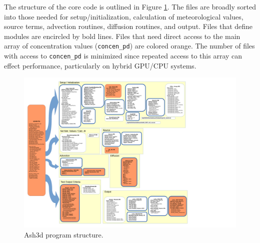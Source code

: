 The structure of the core code is outlined in Figure \ref{FigSoftwareDesign}.
The files are broadly sorted into those needed for setup/initialization,
calculation of meteorological values, source terms, advection routines, 
diffusion routines, and output.  Files that define modules are encircled
by bold lines.  Files that need direct access to the main array of concentration
values (\texttt{concen\_pd}) are colored orange.  The number of files with
access to \texttt{concen\_pd} is minimized since repeated access to this
array can effect performance, particularly on hybrid GPU/CPU systems.
\begin{figure}[htbp]\begin{center}
 \includegraphics[angle=90,scale=0.35]{Figures/Chap_SoftStruct_FlowChartFiles.pdf}
\parbox{15cm}{\caption{\label{FigSoftwareDesign}
Ash3d program structure.
}}
\end{center}\end{figure}

